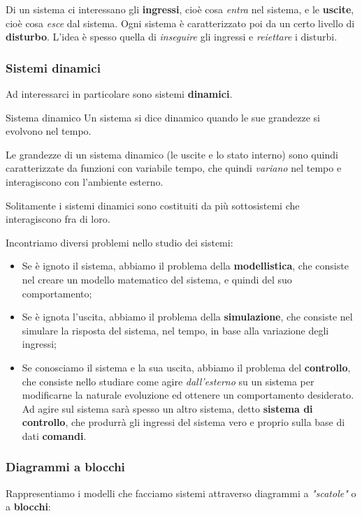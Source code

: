 \documentclass[a4paper,11pt]{article}
\begin{document}
Di un sistema ci interessano gli \textbf{ingressi}, cioè cosa \textit{entra} nel sistema, e le \textbf{uscite}, cioè cosa \textit{esce} dal sistema.
Ogni sistema è caratterizzato poi da un certo livello di \textbf{disturbo}.
L'idea è spesso quella di \textit{inseguire} gli ingressi e \textit{reiettare} i disturbi.

\subsubsection{Sistemi dinamici}
Ad interessarci in particolare sono  sistemi \textbf{dinamici}.
\begin{definition}{Sistema dinamico}
	Un sistema si dice dinamico quando le sue grandezze si evolvono nel tempo.
\end{definition}

Le grandezze di un sistema dinamico (le uscite e lo stato interno) sono quindi caratterizzate da funzioni con variabile tempo, che quindi \textit{variano} nel tempo e interagiscono con l'ambiente esterno.

Solitamente i sistemi dinamici sono costituiti da più sottosistemi che interagiscono fra di loro.

\par\medskip

Incontriamo diversi problemi nello studio dei sistemi:
\begin{itemize}
	\item Se è ignoto il sistema, abbiamo il problema della \textbf{modellistica}, che consiste nel creare un modello matematico del sistema, e quindi del suo comportamento;
	\item Se è ignota l'uscita, abbiamo il problema della \textbf{simulazione}, che consiste nel simulare la risposta del sistema, nel tempo, in base alla variazione degli ingressi;
	\item Se conosciamo il sistema e la sua uscita, abbiamo il problema del \textbf{controllo}, che consiste nello studiare come agire \textit{dall'esterno} su un sistema per modificarne la naturale evoluzione ed ottenere un comportamento desiderato.
		Ad agire sul sistema sarà spesso un altro sistema, detto \textbf{sistema di controllo}, che produrrà gli ingressi del sistema vero e proprio sulla base di dati \textbf{comandi}.
\end{itemize}

\subsubsection{Diagrammi a blocchi}
Rappresentiamo i modelli che facciamo sistemi attraverso diagrammi a \textit{"scatole"} o a \textbf{blocchi}:
\end{document}
